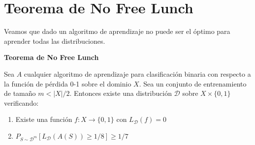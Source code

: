 \section{Teorema de No Free Lunch}
Veamos que dado un algoritmo de aprendizaje no puede ser el óptimo para aprender todas las distribuciones.

\begin{theorem}
\textbf{Teorema de No Free Lunch}

Sea $A$ cualquier algoritmo de aprendizaje para clasificación binaria con respecto a la función de pérdida 0-1 sobre el dominio $X$. Sea un conjunto de entrenamiento de tamaño $m < |X|/2$. Entonces existe una distribución $\mathcal{D}$ sobre $X \times \{0,1\}$ verificando:

\begin{enumerate}
\item Existe una función $f: X \rightarrow \{0,1\}$ con $L_{\mathcal{D}}(f)=0$
\item $P_{S\sim \mathcal{D}^m} [L_{\mathcal{D}} (A(S)) \ge 1/8] \ge 1/7$
\end{enumerate}
\end{theorem}

